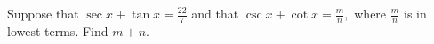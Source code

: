 Suppose that $\sec x+\tan x=\frac{22}7$ and that $\csc x+\cot x=\frac mn,$ where $\frac mn$ is in lowest terms.  Find $m+n.$